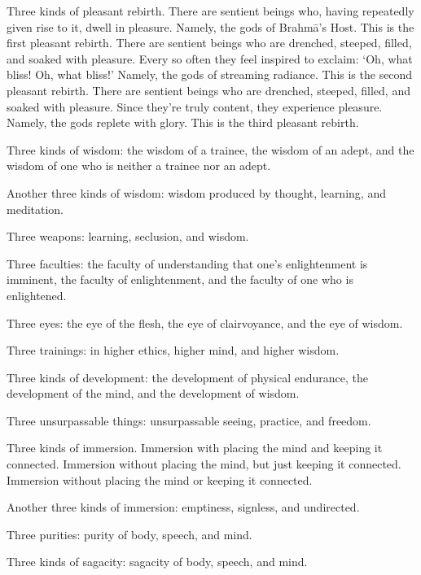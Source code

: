 \documentclass[12pt,openany]{book}%
\begin{document}
Three kinds of pleasant rebirth. There are sentient beings who, having repeatedly given rise to it, dwell in pleasure. Namely, the gods of \textsanskrit{Brahmā}’s Host. This is the first pleasant rebirth. There are sentient beings who are drenched, steeped, filled, and soaked with pleasure. Every so often they feel inspired to exclaim: ‘Oh, what bliss! Oh, what bliss!’ Namely, the gods of streaming radiance. This is the second pleasant rebirth. There are sentient beings who are drenched, steeped, filled, and soaked with pleasure. Since they’re truly content, they experience pleasure. Namely, the gods replete with glory. This is the third pleasant rebirth. 

Three kinds of wisdom: the wisdom of a trainee, the wisdom of an adept, and the wisdom of one who is neither a trainee nor an adept. 

Another three kinds of wisdom: wisdom produced by thought, learning, and meditation. 

Three weapons: learning, seclusion, and wisdom. 

Three faculties: the faculty of understanding that one’s enlightenment is imminent, the faculty of enlightenment, and the faculty of one who is enlightened. 

Three eyes: the eye of the flesh, the eye of clairvoyance, and the eye of wisdom. 

Three trainings: in higher ethics, higher mind, and higher wisdom. 

Three kinds of development: the development of physical endurance, the development of the mind, and the development of wisdom. 

Three unsurpassable things: unsurpassable seeing, practice, and freedom. 

Three kinds of immersion. Immersion with placing the mind and keeping it connected. Immersion without placing the mind, but just keeping it connected. Immersion without placing the mind or keeping it connected. 

Another three kinds of immersion: emptiness, signless, and undirected. 

Three purities: purity of body, speech, and mind. 

Three kinds of sagacity: sagacity of body, speech, and mind. 
\end{document}
